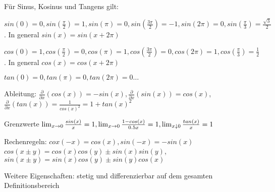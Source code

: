 \begin{definition}[Eigenschaften]
	Für Sinus, Kosinus und Tangens gilt:
	\begin{description}[noitemsep]
		\item $sin(0) = 0, sin( \frac{\pi}{2})=1, sin(\pi) = 0, sin(\frac{3 \pi}{2}) = -1, sin(2 \pi) = 0, sin(\frac{\pi}{3}) = \frac{\sqrt{3}}{2}$. In general $sin(x) = sin(x + 2 \pi)$
		\item $cos(0) = 1, cos (\frac{\pi}{2}) = 0, cos (\pi) = 1, cos(\frac{3 \pi}{2}) = 0, cos (2 \pi) = 1, cos(\frac{\pi}{3}) = \frac{1}{2}$. In general $cos(x) = cos(x + 2 \pi)$
		\item $tan(0) = 0, tan(\pi) = 0, tan(2 \pi) = 0 \dots$ 
		\item Ableitung: $\frac{\partial}{\partial x}(cos(x)) = -sin(x), \frac{\partial}{\partial x}(sin(x)) = cos(x)$, \\ $\frac{\partial}{\partial x}(tan(x)) = \frac{1}{cos(x)^2} = 1 + tan(x)^2$
		\item Grenzwerte $\lim_{x \rightarrow 0} \frac{sin(x)}{x} = 1, \lim_{x \rightarrow 0} \frac{1 - cos(x)}{0.5x} = 1, \lim_{x \downarrow 0} \frac{tan (x)}{x} = 1$
		\item Rechenregeln: $cox(-x) = cos(x), sin(-x) = -sin(x)$ \\ $cos(x \pm y) = cos(x)cos(y) \pm sin(x)sin(y)$, \\ $sin(x \pm y) = sin(x)cos(y) \pm sin(y)cos(x)$
		\item Weitere Eigenschaften: stetig und differenzierbar auf dem gesamten Definitionsbereich
	\end{description}
\end{definition}



